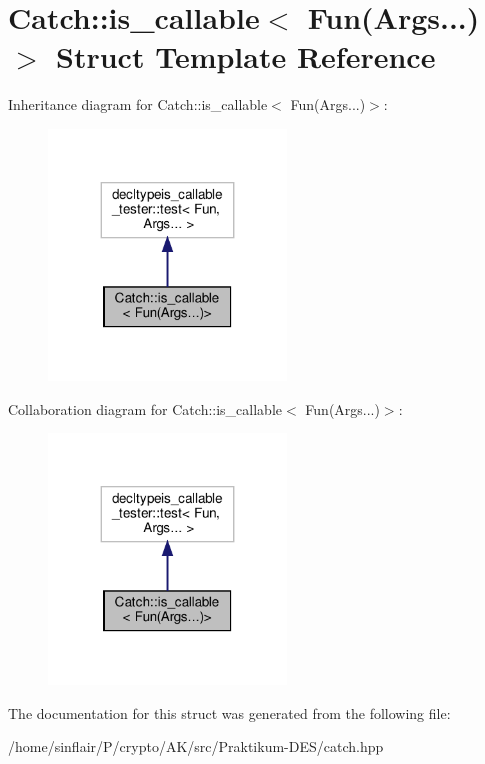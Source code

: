 \hypertarget{structCatch_1_1is__callable_3_01Fun_07Args_8_8_8_08_4}{}\section{Catch\+:\+:is\+\_\+callable$<$ Fun(Args...)$>$ Struct Template Reference}
\label{structCatch_1_1is__callable_3_01Fun_07Args_8_8_8_08_4}


Inheritance diagram for Catch\+:\+:is\+\_\+callable$<$ Fun(Args...)$>$\+:
\nopagebreak
\begin{figure}[H]
\begin{center}
\leavevmode
\includegraphics[width=179pt]{structCatch_1_1is__callable_3_01Fun_07Args_8_8_8_08_4__inherit__graph}
\end{center}
\end{figure}


Collaboration diagram for Catch\+:\+:is\+\_\+callable$<$ Fun(Args...)$>$\+:
\nopagebreak
\begin{figure}[H]
\begin{center}
\leavevmode
\includegraphics[width=179pt]{structCatch_1_1is__callable_3_01Fun_07Args_8_8_8_08_4__coll__graph}
\end{center}
\end{figure}


The documentation for this struct was generated from the following file\+:\begin{DoxyCompactItemize}
\item 
/home/sinflair/\+P/crypto/\+A\+K/src/\+Praktikum-\/\+D\+E\+S/catch.\+hpp\end{DoxyCompactItemize}
